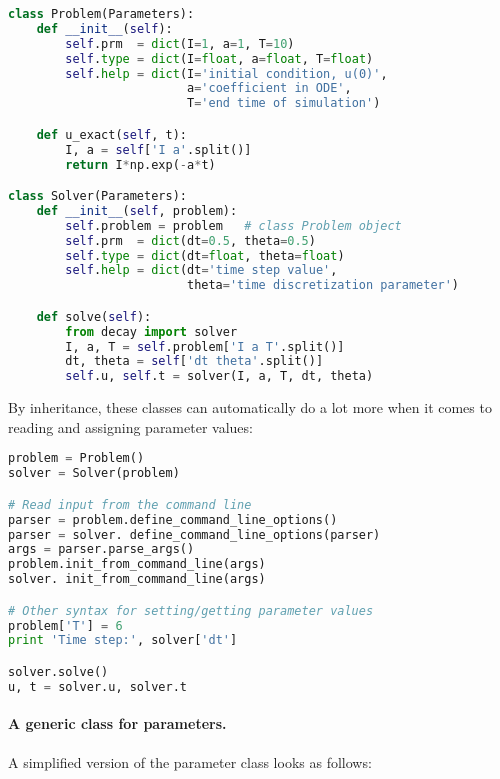 \documentclass[graybox,sectrefs,envcountresetchap,open=right,final]{svmonodo}
\begin{document}
\begin{lstlisting}[language=Python,style=blue1_bluegreen]
class Problem(Parameters):
    def __init__(self):
        self.prm  = dict(I=1, a=1, T=10)
        self.type = dict(I=float, a=float, T=float)
        self.help = dict(I='initial condition, u(0)',
                         a='coefficient in ODE',
                         T='end time of simulation')

    def u_exact(self, t):
        I, a = self['I a'.split()]
        return I*np.exp(-a*t)

class Solver(Parameters):
    def __init__(self, problem):
        self.problem = problem   # class Problem object
        self.prm  = dict(dt=0.5, theta=0.5)
        self.type = dict(dt=float, theta=float)
        self.help = dict(dt='time step value',
                         theta='time discretization parameter')

    def solve(self):
        from decay import solver
        I, a, T = self.problem['I a T'.split()]
        dt, theta = self['dt theta'.split()]
        self.u, self.t = solver(I, a, T, dt, theta)
\end{lstlisting}
By inheritance, these classes can automatically do a lot more when it comes to
reading and assigning parameter values:

\begin{lstlisting}[language=Python,style=blue1_bluegreen]
problem = Problem()
solver = Solver(problem)

# Read input from the command line
parser = problem.define_command_line_options()
parser = solver. define_command_line_options(parser)
args = parser.parse_args()
problem.init_from_command_line(args)
solver. init_from_command_line(args)

# Other syntax for setting/getting parameter values
problem['T'] = 6
print 'Time step:', solver['dt']

solver.solve()
u, t = solver.u, solver.t
\end{lstlisting}

\paragraph{A generic class for parameters.}
A simplified version of the parameter class looks as follows:
\end{document}
